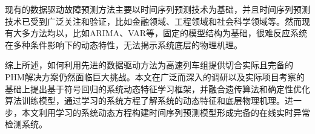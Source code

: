 现有的数据驱动故障预测方法主要以时间序列预测技术为基础，并且时间序列预测技术已受到广泛关注和验证，比如金融领域、工程领域和社会科学领域等\cite{brockwell2016introduction}。然而现有大多方法均以，比如ARIMA、VAR等，固定的模型结构为基础，很难反应系统在多种条件影响下的动态特性，无法揭示系统底层的物理机理。

综上所述，如何利用先进的数据驱动方法为高速列车组提供切合实际且完备的PHM解决方案仍然面临巨大挑战。本文在广泛而深入的调研以及实际项目考察的基础上提出基于符号回归的系统动态特征学习框架，并融合遗传算法和确定性优化算法训练模型，通过学习的系统方程了解系统的动态特征和底层物理机理。进一步，本文利用学习的系统动态方程构建时间序列预测模型形成完备的在线实时异常检测系统。





